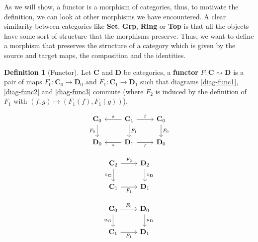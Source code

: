 \documentclass{article}
\theoremstyle{definition}
\newtheorem{defn}[thm]{Definition}
\theoremstyle{remark}
\begin{document}
As we will show, a functor is a morphism of categories, thus, to motivate the definition, we can look at other morphisms we have encountered. A clear similarity between categories like \textbf{Set}, \textbf{Grp}, \textbf{Ring} or \textbf{Top} is that all the objects have some sort of structure that the morphisms preserve. Thus, we want to define a morphism that preserves the structure of a category which is given by the source and target maps, the composition and the identities.
\begin{defn}[Functor]
	Let $\mathbf{C}$ and $\mathbf{D}$ be categories, a \textbf{functor} $F: \mathbf{C} \rightsquigarrow \mathbf{D}$ is a pair of maps $F_0:\mathbf{C}_0 \rightarrow \mathbf{D}_0$ and $F_1:\mathbf{C}_1 \rightarrow \mathbf{D}_1$ such that diagrams \eqref{diag-func1}, \eqref{diag-func2} and \eqref{diag-func3} commute (where $F_2$ is induced by the definition of $F_1$ with $(f,g) \mapsto (F_1(f), F_1(g))$).
	
	\begin{minipage}{0.37\textwidth}
		\begin{equation}\label{diag-func1}
		\begin{tikzcd}
			\mathbf{C}_0 \arrow[d, "F_0"'] & \mathbf{C}_1 \arrow[d, "F_1"] \arrow[l, "s"'] \arrow[r, "t"] & \mathbf{C}_0 \arrow[d, "F_0"] \\
			\mathbf{D}_0 & \mathbf{D}_1 \arrow[l, "s"] \arrow[r, "t"'] & \mathbf{D}_0
		\end{tikzcd}
		\end{equation}
	\end{minipage}	
	\begin{minipage}{0.26\textwidth}
		\begin{equation}\label{diag-func2}
		\begin{tikzcd}
			\mathbf{C}_2 \arrow[d, "\circ_\mathbf{C}"'] \arrow[r, "F_2"] & \mathbf{D}_2 \arrow[d, "\circ_\mathbf{D}"] \\
			\mathbf{C}_1 \arrow[r, "F_1"'] & \mathbf{D}_1
		\end{tikzcd}
		\end{equation}
	\end{minipage}
	\begin{minipage}{0.26\textwidth}
			\begin{equation}\label{diag-func3}
		\begin{tikzcd}
			\mathbf{C}_0 \arrow[d, "u_{\mathbf{C}}"'] \arrow[r, "F_0"] & \mathbf{D}_0 \arrow[d, "u_{\mathbf{D}}"] \\
			\mathbf{C}_1 \arrow[r, "F_1"'] & \mathbf{D}_1
		\end{tikzcd}
		\end{equation}
	\end{minipage}
\end{defn}
\end{document}
